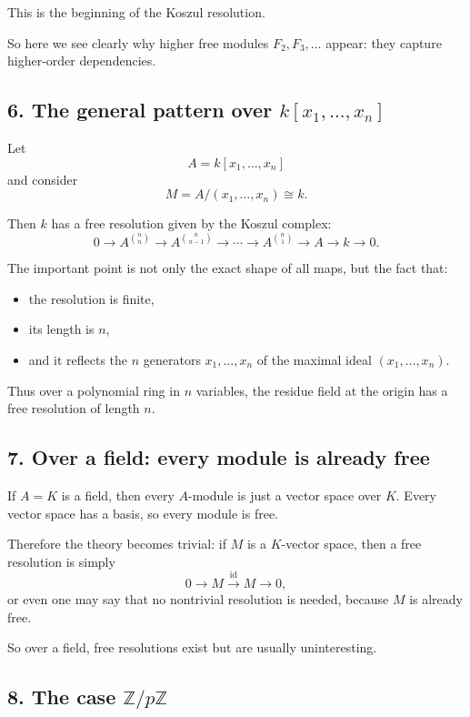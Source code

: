 \documentclass[12pt,a4paper]{article}
\theoremstyle{notespace}
\theoremstyle{definition}
\begin{document}
This is the beginning of the Koszul resolution.

So here we see clearly why higher free modules \(F_2,F_3,\dots\) appear: they capture higher-order dependencies.

\subsection{6. The general pattern over \(k[x_1,\dots,x_n]\)}

Let
\[
A=k[x_1,\dots,x_n]
\]
and consider
\[
M=A/(x_1,\dots,x_n)\cong k.
\]

Then \(k\) has a free resolution given by the Koszul complex:
\[
0 \longrightarrow A^{\binom{n}{n}} \longrightarrow A^{\binom{n}{n-1}}
\longrightarrow \cdots \longrightarrow A^{\binom{n}{1}}
\longrightarrow A \longrightarrow k \longrightarrow 0.
\]

The important point is not only the exact shape of all maps, but the fact that:
\begin{itemize}
	\item the resolution is finite,
	\item its length is \(n\),
	\item and it reflects the \(n\) generators \(x_1,\dots,x_n\) of the maximal ideal \((x_1,\dots,x_n)\).
\end{itemize}

Thus over a polynomial ring in \(n\) variables, the residue field at the origin has a free resolution of length \(n\).

\subsection{7. Over a field: every module is already free}

If \(A=K\) is a field, then every \(A\)-module is just a vector space over \(K\). Every vector space has a basis, so every module is free.

Therefore the theory becomes trivial: if \(M\) is a \(K\)-vector space, then a free resolution is simply
\[
0 \longrightarrow M \xrightarrow{\mathrm{id}} M \longrightarrow 0,
\]
or even one may say that no nontrivial resolution is needed, because \(M\) is already free.

So over a field, free resolutions exist but are usually uninteresting.

\subsection{8. The case \(\mathbb Z/p\mathbb Z\)}
\end{document}
